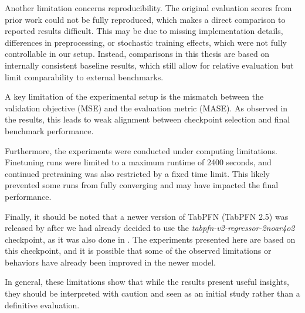 Another limitation concerns reproducibility.
The original evaluation scores from prior work could not be fully reproduced, which makes a direct comparison to reported results difficult.
This may be due to missing implementation details, differences in preprocessing, or stochastic training effects, which were not fully controllable in our setup.
Instead, comparisons in this thesis are based on internally consistent baseline results, which still allow for relative evaluation but limit comparability to external benchmarks.

A key limitation of the experimental setup is the mismatch between the validation objective (MSE) and the evaluation metric (MASE).
As observed in the results, this leads to weak alignment between checkpoint selection and final benchmark performance.

Furthermore, the experiments were conducted under computing limitations.
Finetuning runs were limited to a maximum runtime of 2400 seconds, and continued pretraining was also restricted by a fixed time limit.
This likely prevented some runs from fully converging and may have impacted the final performance.

Finally, it should be noted that a newer version of TabPFN (TabPFN 2.5) was released by \citet{grinsztajn2025tabpfn} after we had already decided to use the \textit{tabpfn-v2-regressor-2noar4o2} checkpoint, as it was also done in \citet{hoo2025tables}.
The experiments presented here are based on this checkpoint, and it is possible that some of the observed limitations or behaviors have already been improved in the newer model.

In general, these limitations show that while the results present useful insights, they should be interpreted with caution and seen as an initial study rather than a definitive evaluation.





